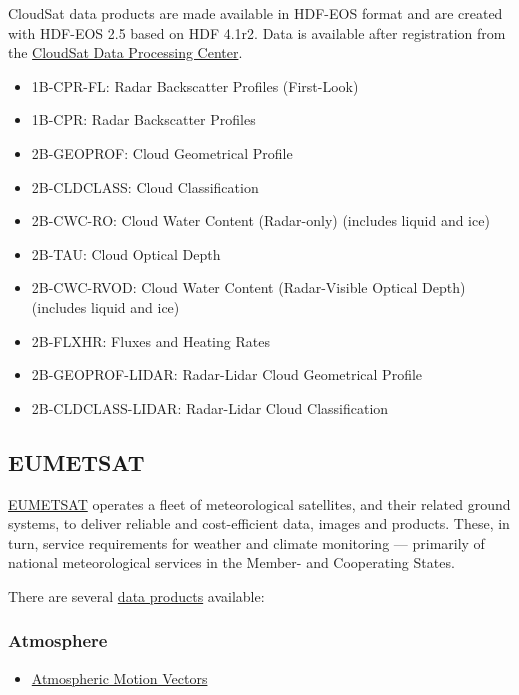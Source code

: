 \documentclass[11pt]{article}
\begin{document}
CloudSat data products are made available in HDF-EOS format and
are created with HDF-EOS 2.5 based on HDF 4.1r2. Data is available
after registration from the \href{http://www.cloudsat.cira.colostate.edu/data_dist/OrderData.php}{CloudSat Data Processing Center}.

\begin{itemize}
\item 1B-CPR-FL: Radar Backscatter Profiles (First-Look)
\item 1B-CPR: Radar Backscatter Profiles
\item 2B-GEOPROF: Cloud Geometrical Profile
\item 2B-CLDCLASS: Cloud Classification
\item 2B-CWC-RO: Cloud Water Content (Radar-only) (includes liquid and ice)
\item 2B-TAU: Cloud Optical Depth
\item 2B-CWC-RVOD: Cloud Water Content (Radar-Visible Optical Depth) (includes liquid and ice)
\item 2B-FLXHR: Fluxes and Heating Rates
\item 2B-GEOPROF-LIDAR: Radar-Lidar Cloud Geometrical Profile
\item 2B-CLDCLASS-LIDAR: Radar-Lidar Cloud Classification
\end{itemize}

\subsection{EUMETSAT}
\label{sec-1-6}

\href{http://www.eumetsat.int}{EUMETSAT} operates a fleet of meteorological satellites, and their
related ground systems, to deliver reliable and cost-efficient
data, images and products. These, in turn, service requirements
for weather and climate monitoring — primarily of national
meteorological services in the Member- and Cooperating States.

There are several \href{http://www.eumetsat.int/Home/Main/DataProducts/ProductNavigator/index.htm?l=en}{data products} available:

\subsubsection{Atmosphere}
\label{sec-1-6-1}

\begin{itemize}
\item \href{http://navigator.eumetsat.int/discovery/Start/DirectSearch/Extended.do?freeTextValue%2528resourceidentifier%2529=EO:EUM:DAT:MSG:AMV}{Atmospheric Motion Vectors}
\end{itemize}
\end{document}
